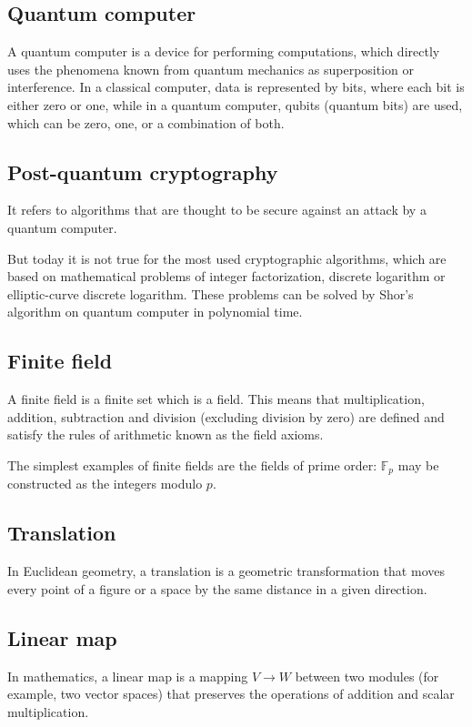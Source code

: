 \documentclass[thesis=M,english]{FITthesis}[2019/12/23]
\begin{document}
\subsection{Quantum computer}
A quantum computer is a device for performing computations, which directly uses the phenomena known from quantum mechanics as superposition or interference. In a classical computer, data is represented by bits, where each bit is either zero or one, while in a quantum computer, qubits (quantum bits) are used, which can be zero, one, or a combination of both.

\subsection{Post-quantum cryptography}
It refers to algorithms that are thought to be secure against an attack by a quantum computer.

But today it is not true for the most used cryptographic algorithms, which are based on mathematical problems of integer factorization, discrete logarithm or elliptic-curve discrete logarithm. These problems can be solved by Shor's algorithm on quantum computer in polynomial time.

\subsection{Finite field}
A finite field is a finite set which is a field. This means that multiplication, addition, subtraction and division (excluding division by zero) are defined and satisfy the rules of arithmetic known as the field axioms.

The simplest examples of finite fields are the fields of prime order: $\mathbb {F}_{p}$ may be constructed as the integers modulo $p$.

\subsection{Translation}
In Euclidean geometry, a translation is a geometric transformation that moves every point of a figure or a space by the same distance in a given direction.

\subsection{Linear map}
In mathematics, a linear map is a mapping $V \rightarrow W$ between two modules (for example, two vector spaces) that preserves the operations of addition and scalar multiplication.
\end{document}
